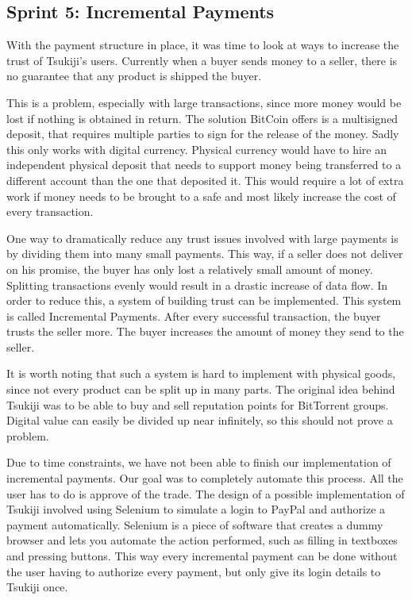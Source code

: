 \subsection{Sprint 5: Incremental Payments}
\label{incpay}
With the payment structure in place, it was time to look at ways to increase the trust of Tsukiji's users.
Currently when a buyer sends money to a seller, there is no guarantee that any product is shipped the buyer.

This is a problem, especially with large transactions, since more money would be lost if nothing is obtained in return.
The solution BitCoin offers is a multisigned deposit, that requires multiple parties to sign for the release of the money.
Sadly this only works with digital currency.
Physical currency would have to hire an independent physical deposit that needs to support money being transferred to a different account than the one that deposited it.
This would require a lot of extra work if money needs to be brought to a safe and most likely increase the cost of every transaction.

One way to dramatically reduce any trust issues involved with large payments is by dividing them into many small payments.
This way, if a seller does not deliver on his promise, the buyer has only lost a relatively small amount of money.
Splitting transactions evenly would result in a drastic increase of data flow. 
In order to reduce this, a system of building trust can be implemented.
This system is called Incremental Payments.
After every successful transaction, the buyer trusts the seller more.
The buyer increases the amount of money they send to the seller.

It is worth noting that such a system is hard to implement with physical goods, since not every product can be split up in many parts.
The original idea behind Tsukiji was to be able to buy and sell reputation points for BitTorrent groups.
Digital value can easily be divided up near infinitely, so this should not prove a problem.

Due to time constraints, we have not been able to finish our implementation of incremental payments.
Our goal was to completely automate this process.
All the user has to do is approve of the trade.
The design of a possible implementation of Tsukiji involved using Selenium to simulate a login to PayPal and authorize a payment automatically.
Selenium \cite{selenium} is a piece of software that creates a dummy browser and lets you automate the action performed, such as filling in textboxes and pressing buttons.
This way every incremental payment can be done without the user having to authorize every payment, but only give its login details to Tsukiji once.

